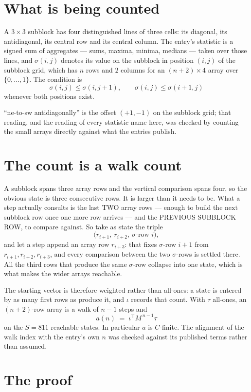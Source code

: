 \documentclass[11pt,a4paper]{article}
\theoremstyle{plain}
\theoremstyle{definition}
\begin{document}
\section{What is being counted}

A $3\times3$ subblock has four distinguished lines of three cells: its diagonal, its
antidiagonal, its central row and its central column. The entry's statistic is a signed sum of
aggregates --- sums, maxima, minima, medians --- taken over those lines, and $\sigma(i,j)$
denotes its value on the subblock in position $(i,j)$ of the subblock grid, which has $n$ rows
and $2$ columns for an $(n+2)\times4$ array over $\{0,\dots,1\}$. The condition is
\[
\sigma(i,j)\le\sigma(i,j+1),\qquad \sigma(i,j)\le\sigma(i+1,j)
\]
whenever both positions exist.

``ne-to-sw antidiagonally'' is the offset $(+1,-1)$ on the subblock grid; that reading, and
the reading of every statistic name here, was checked by counting the small arrays directly
against what the entries publish.

\section{The count is a walk count}

A subblock spans three array rows and the vertical comparison spans four, so the obvious state
is three consecutive rows. It is larger than it needs to be. What a step actually consults is
the last TWO array rows --- enough to build the next subblock row once one more row arrives ---
and the PREVIOUS SUBBLOCK ROW, to compare against. So take as state the triple
\[
\bigl(r_{i+1},\ r_{i+2},\ \sigma\text{-row }i\bigr),
\]
and let a step append an array row $r_{i+3}$: that fixes $\sigma$-row $i+1$ from
$r_{i+1},r_{i+2},r_{i+3}$, and every comparison between the two $\sigma$-rows is settled
there. All the third rows that produce the same $\sigma$-row collapse into one state, which is
what makes the wider arrays reachable.

The starting vector is therefore weighted rather than all-ones: a state is entered by as many
first rows as produce it, and $\iota$ records that count. With $\tau$ all-ones, an
$(n+2)$-row array is a walk of $n-1$ steps and
\[
a(n)\;=\;\iota^{\!\top}M^{\,n-1}\tau
\]
on the $S=811$ reachable states. In particular $a$ is $C$-finite. The alignment of the walk
index with the entry's own $n$ was checked against its published terms rather than assumed.

\section{The proof}
\end{document}
